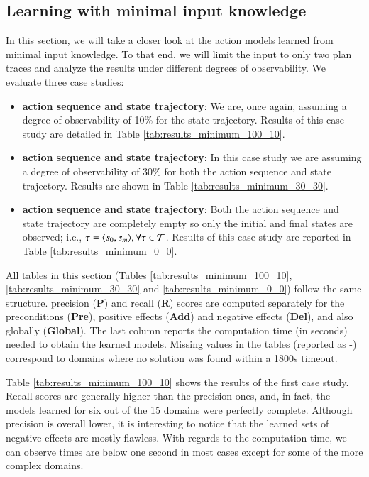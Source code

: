 \subsection{Learning with minimal input knowledge}
\label{minimal}


In this section, we will take a closer look at the action models learned from minimal input knowledge. To that end, we will limit the input to only two plan traces and analyze the results under different degrees of observability. We evaluate three case studies:

\begin{itemize}
	\item \textbf{\FO action sequence and \PO state trajectory}: We are, once again, assuming a degree of observability of 10\% for the state trajectory. Results of this case study are detailed in Table \ref{tab:results_minimum_100_10}.
	\item  \textbf{\PO action sequence and \PO state trajectory}: In this case study we are assuming a degree of observability of 30\% for both the action sequence and state trajectory. Results are shown in Table \ref{tab:results_minimum_30_30}.
	\item  \textbf{\NO action sequence and \NO state trajectory}: Both the action sequence and state trajectory are completely empty so only the initial and final states are observed; i.e., $\tau = {\langle s_0, s_m \rangle}, \forall \tau \in \mathcal{T}$. Results of this case study are reported in Table \ref{tab:results_minimum_0_0}.
\end{itemize}

All tables in this section (Tables \ref{tab:results_minimum_100_10}, \ref{tab:results_minimum_30_30} and \ref{tab:results_minimum_0_0}) follow the same structure. precision ({\bf P}) and recall ({\bf R}) scores are computed separately for the preconditions ({\bf Pre}), positive effects ({\bf Add}) and negative effects ({\bf Del}), and also globally ({\bf Global}). The last column reports the computation time (in seconds) needed to obtain the learned models. Missing values in the tables (reported as -) correspond to domains where no solution was found within a 1800s timeout.

Table \ref{tab:results_minimum_100_10} shows the results of the first case study. Recall scores are generally higher than the precision ones, and, in fact, the models learned for six out of the 15 domains were perfectly complete. Although precision is overall lower, it is interesting to notice that the learned sets of negative effects are mostly flawless. With regards to the computation time, we can observe times are below one second in most cases except for some of the more complex domains.

